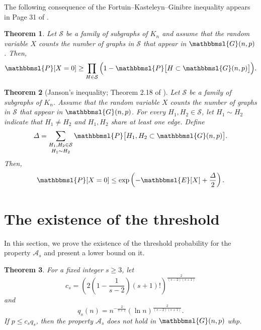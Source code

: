\documentclass[hidelinks, 11pt]{article}
\theoremstyle{plain}
\newtheorem{theorem}{Theorem}[section]
\theoremstyle{definition}
\begin{document}
The following consequence  of the  Fortuin--Kasteleyn--Ginibre  inequality  \cite[Theorem 2.12]{RG}  appears in  Page 31 of \cite{RG}.


\begin{theorem}\label{FKG}
Let $\mathcal{S}$ be a family of subgraphs of $K_n$ and assume that   the random variable $X$    counts  the number of graphs in  $\mathcal{S}$ that appear in $\mathbbmsl{G}(n,p)$. Then,
$$\mathbbmsl{P}[X=0]\geq\prod_{H\in \mathcal{S}}\Big(1-\mathbbmsl{P}\big[H\subset\mathbbmsl{G}(n,p)\big]\Big).$$
\end{theorem}




\begin{theorem}[Janson's inequality;  Theorem 2.18 of \cite{RG}]\label{Janson}
Let $\mathcal{S}$ be a family of subgraphs of $K_n$. Assume that   the random variable $X$    counts  the number of graphs in  $\mathcal{S}$ that appear in $\mathbbmsl{G}(n,p)$. For every $H_1,H_2\in\mathcal{S}$, let $H_1\sim H_2$ indicate  that $H_1\neq H_2$ and $H_1, H_2$  share at least one edge. Define
$$\mathnormal{\Delta}=\mathop{\sum_{H_1, H_2\in\mathcal{S}}}_{H_1\sim H_2}\mathbbmsl{P}\big[H_1, H_2\subset\mathbbmsl{G}(n,p)\big].$$
Then,
$$\mathbbmsl{P}[X=0]\leq\exp\left(-\mathbbmsl{E}[X]+\frac{\mathnormal{\Delta}}{2}\right).$$
\end{theorem}



\section{The existence of the   threshold}\label{secLowerP}



In this section, we prove the existence of the  threshold probability  for the property   $\mathcal{A}_s$  and present a lower bound on it.



\begin{theorem}\label{lower-ii}
For a  fixed integer  $s\geq 3$,  let
$$c_s=\left(2\left(1-\frac{1}{s-2}\right)(s+1)!\right)^{\frac{2}{(s-2)(s+1)}}$$  and $$q_s(n)=n^{-\frac2{s+1}}(\ln n)^\frac{2}{(s-2)(s+1)}.$$
If $p\leq c_sq_s$, then   the property   $\mathcal{A}_s$ does not hold in $\mathbbmsl{G}(n, p)$ whp.
\end{theorem}
\end{document}

